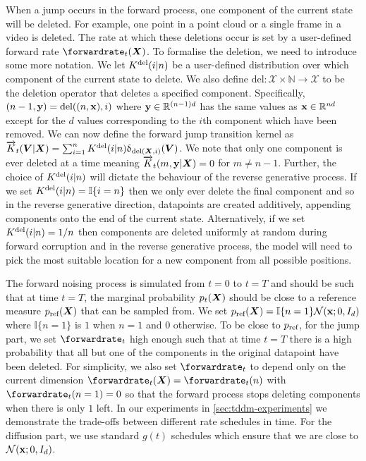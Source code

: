 When a jump occurs in the forward process, one component of the current state will be deleted.
For example, one point in a point cloud or a single frame in a video is deleted. The rate at which these deletions occur is set by a user-defined forward rate $\smash{\forwardrate_t}(\mX)$. To formalise the deletion, we need to introduce some more notation. We let $K^{\textup{del}}(i | n)$ be a user-defined distribution over which component of the current state to delete. We also define $\text{del}: \mathcal{X} \times \mathbb{N} \rightarrow \mathcal{X}$ to be the deletion operator that deletes a specified component. Specifically, $(n-1, {\mathbf{y}}) = \text{del}((n, {\mathbf{x}}), i)$ where ${\mathbf{y}} \in \mathbb{R}^{(n-1)d}$ has the same values as ${\mathbf{x}} \in \mathbb{R}^{nd}$ except for the $d$ values corresponding to the $i$th component which have been removed. 
We can now define the forward jump transition kernel as $\overrightarrow{K}_t({\bm{V}} | {\bm{X}}) = \sum_{i=1}^n K^{\textup{del}} (i | n) \updelta_{\text{del}({\bm{X}}, i)}({\bm{V}})$. We note that only one
component is ever deleted at a time meaning $\overrightarrow{K}_t(m, {\mathbf{y}} | {\bm{X}}) = 0$ for $m \neq n - 1$. Further, the choice of $K^{\textup{del}}(i | n)$ will dictate the behaviour of the reverse generative process. If we set $K^{\textup{del}}(i | n) = \mathbb{I}\{i=n\}$ then we only ever delete the final component and so in the reverse generative direction, datapoints are created additively, appending components onto the end of the current state. Alternatively, if we set $K^{\textup{del}}(i | n) = 1/n$ then components are deleted uniformly at random during forward corruption and in the reverse generative process, the model will need to pick the most suitable location for a new component from all possible positions.

The forward noising process is simulated from $t=0$ to $t=T$ and should be such that at time $t=T$, the marginal probability $p_t({\bm{X}})$ should be close to a reference measure $p_{\textup{ref}}({\bm{X}})$ that can be sampled from. 
We set $p_{\textup{ref}}({\bm{X}}) = \mathbb{I} \{ n = 1\} \mathcal{N}({\mathbf{x}}; 0, I_{d})$ where $\mathbb{I} \{ n = 1\}$ is $1$ when $n=1$ and $0$ otherwise. To be close to $p_{\textup{ref}}$, for the jump part, we set $\forwardrate_t$ high enough such that at time $t=T$ there is a high probability that all but one of the components in the original datapoint have been deleted. For simplicity, we also set $\forwardrate_t$ to depend only on the current dimension $\forwardrate_t(\mX) = \forwardrate_t(n)$ with $\forwardrate_t(n=1) = 0$ so that the forward process stops deleting components when there is only $1$ left. In our experiments in \cref{sec:tddm-experiments} we demonstrate the trade-offs between different rate schedules in time. For the diffusion part, we use standard $g(t)$ schedules which ensure that we are close to $\mathcal{N}({\mathbf{x}}; 0, I_{d})$.

